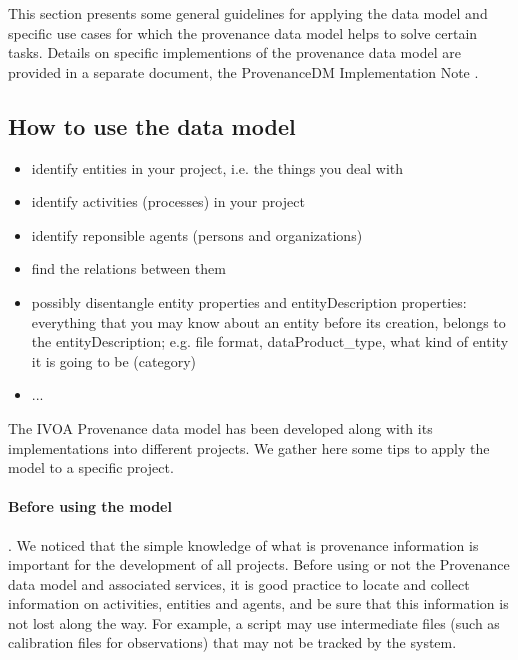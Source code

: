 %

This section presents some general guidelines for applying the data model and
specific use cases for which the provenance data model helps to solve certain tasks. Details on specific implementions of the provenance data model are provided in a separate document, the ProvenanceDM Implementation Note \citep{std:ProvenanceImplementationNote}.


\subsection{How to use the data model}
\begin{itemize}
\item identify entities in your project, i.e. the things you deal with
\item identify activities (processes) in your project
\item identify reponsible agents (persons and organizations)
\item find the relations between them
\item possibly disentangle entity properties and entityDescription properties: everything that you may know about an entity before its creation, belongs to the entityDescription; e.g. file format, dataProduct\_type, what kind of entity it is going to be (category)
\item ...
\end{itemize}

The IVOA Provenance data model has been developed along with its implementations into different projects. We gather here some tips to apply the model to a specific project.

\paragraph{Before using the model}. We noticed that the simple knowledge of what is provenance information is important for the development of all projects. Before using or not the Provenance data model and associated services, it is good practice to locate and collect information on activities, entities and agents, and be sure that this information is not lost along the way. For example, a script may use intermediate files (such as calibration files for observations) that may not be tracked by the system.


